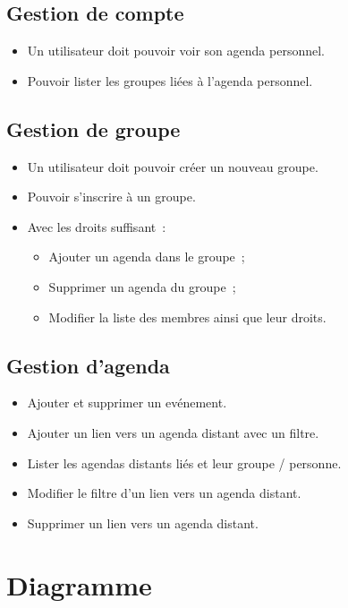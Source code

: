 \documentclass[a4paper,12pt]{article}
\begin{document}
\subsection{Gestion de compte}

\begin{itemize}
	\item Un utilisateur doit pouvoir voir son agenda personnel.
	\item Pouvoir lister les groupes liées à l'agenda personnel.
\end{itemize}

\subsection{Gestion de groupe}

\begin{itemize}
	\item Un utilisateur doit pouvoir créer un nouveau groupe.
	\item Pouvoir s'inscrire à un groupe.
	\item Avec les droits suffisant~:
	\begin{itemize}
		\item Ajouter un agenda dans le groupe~;
		\item Supprimer un agenda du groupe~;
		\item Modifier la liste des membres ainsi que leur droits.
	\end{itemize}
\end{itemize}

\subsection{Gestion d'agenda}

\begin{itemize}
	\item Ajouter et supprimer un evénement.
	\item Ajouter un lien vers un agenda distant avec un filtre.
	\item Lister les agendas distants liés et leur groupe / personne.
	\item Modifier le filtre d'un lien vers un agenda distant.
	\item Supprimer un lien vers un agenda distant.
\end{itemize}

\section{Diagramme}
\end{document}
